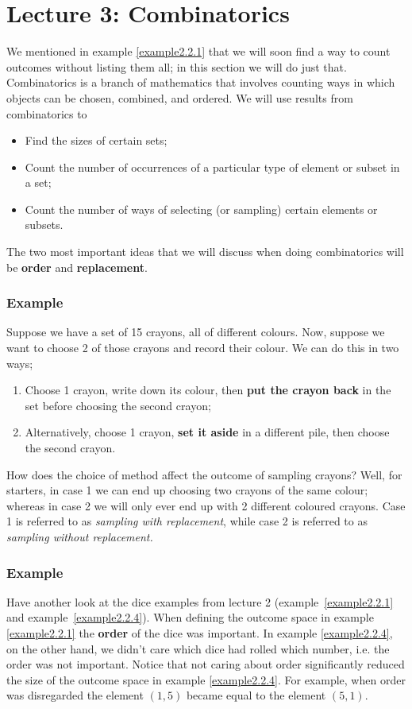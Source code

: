 \chapter{Lecture 3: Combinatorics} \label{lect3}
We mentioned in example \ref{example2.2.1} that we will soon find a way to count outcomes without listing them all; in this section we will do just that. Combinatorics \label{combinatorics} is a branch of mathematics that involves counting ways in which objects can be chosen, combined, and ordered. We will use results from combinatorics to \label{order2}
\begin{itemize}
\item
Find the sizes of certain sets;
\item
Count the number of occurrences of a particular type of element or subset in a set;
\item
Count the number of ways of selecting (or sampling) certain elements or subsets.
\end{itemize}
The two most important ideas that we will discuss when doing combinatorics will be \textbf{order} and \textbf{replacement}. \label{replacement}
\subsection{Example}
Suppose we have a set of 15 crayons, all of different colours. Now, suppose we want to choose 2 of those crayons and record their colour. We can do this in two ways;
\begin{enumerate}
\item
Choose 1 crayon, write down its colour, then \textbf{put the crayon back} in the set before choosing the second crayon; 
\item
Alternatively, choose 1 crayon, \textbf{set it aside} in a different pile, then choose the second crayon.
\end{enumerate}
How does the choice of method affect the outcome of sampling crayons? Well, for starters, in case 1 we can end up choosing two crayons of the same colour; whereas in case 2 we will only ever end up with 2 different coloured crayons. Case 1 is referred to as \textit{sampling with replacement}, while case 2 is referred to as \textit{sampling without replacement.}

\subsection{Example}
Have another look at the dice examples from
lecture 2 (example~\ref{example2.2.1} and example~\ref{example2.2.4}). When defining the outcome space in example \ref{example2.2.1} the \textbf{order} of the dice was important. In example \ref{example2.2.4}, on the other hand, we didn't care which dice had rolled which number, i.e. the order was not important. Notice that not caring about order significantly reduced the size of the outcome space in example \ref{example2.2.4}. For example, when order was disregarded the element $(1,5)$ became equal to the element $(5,1).$

